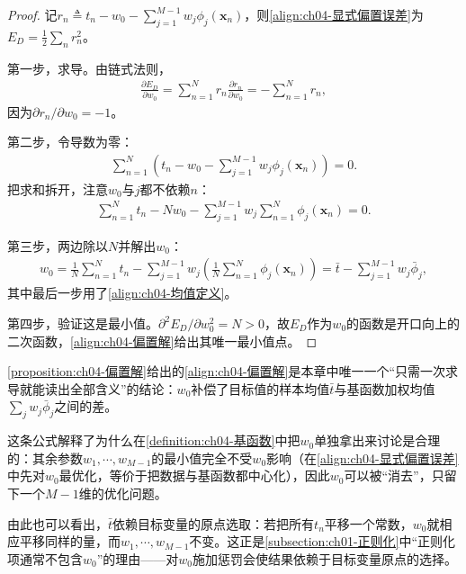 \documentclass[../../main.tex]{subfiles}
\begin{document}
\begin{proof}
记$r_n\triangleq t_n-w_0-\sum_{j=1}^{M-1}w_j\phi_j(\boldsymbol{x}_n)$，则\eqref{align:ch04-显式偏置误差}为$E_D=\frac{1}{2}\sum_n r_n^2$。

第一步，求导。由链式法则，
\begin{align*}
  \frac{\partial E_D}{\partial w_0}=\sum_{n=1}^{N}r_n\frac{\partial r_n}{\partial w_0}=-\sum_{n=1}^{N}r_n,
\end{align*}
因为$\partial r_n/\partial w_0=-1$。

第二步，令导数为零：
\begin{align*}
  \sum_{n=1}^{N}\left(t_n-w_0-\sum_{j=1}^{M-1}w_j\phi_j(\boldsymbol{x}_n)\right)=0.
\end{align*}
把求和拆开，注意$w_0$与$j$都不依赖$n$：
\begin{align*}
  \sum_{n=1}^{N}t_n-Nw_0-\sum_{j=1}^{M-1}w_j\sum_{n=1}^{N}\phi_j(\boldsymbol{x}_n)=0.
\end{align*}

第三步，两边除以$N$并解出$w_0$：
\begin{align*}
  w_0=\frac{1}{N}\sum_{n=1}^{N}t_n-\sum_{j=1}^{M-1}w_j\left(\frac{1}{N}\sum_{n=1}^{N}\phi_j(\boldsymbol{x}_n)\right)=\bar{t}-\sum_{j=1}^{M-1}w_j\bar{\phi}_j,
\end{align*}
其中最后一步用了\eqref{align:ch04-均值定义}。

第四步，验证这是最小值。$\partial^2E_D/\partial w_0^2=N>0$，故$E_D$作为$w_0$的函数是开口向上的二次函数，\eqref{align:ch04-偏置解}给出其唯一最小值点。
\end{proof}

\begin{remark}
\cref{proposition:ch04-偏置解}给出的\eqref{align:ch04-偏置解}是本章中唯一一个“只需一次求导就能读出全部含义”的结论：$w_0$补偿了目标值的样本均值$\bar{t}$与基函数加权均值$\sum_jw_j\bar{\phi}_j$之间的差。

这条公式解释了为什么在\cref{definition:ch04-基函数}中把$w_0$单独拿出来讨论是合理的：其余参数$w_1,\cdots,w_{M-1}$的最小值完全不受$w_0$影响（在\eqref{align:ch04-显式偏置误差}中先对$w_0$最优化，等价于把数据与基函数都中心化），因此$w_0$可以被“消去”，只留下一个$M-1$维的优化问题。

由此也可以看出，$\bar{t}$依赖目标变量的原点选取：若把所有$t_n$平移一个常数，$w_0$就相应平移同样的量，而$w_1,\cdots,w_{M-1}$不变。这正是\cref{subsection:ch01-正则化}中“正则化项通常不包含$w_0$”的理由——对$w_0$施加惩罚会使结果依赖于目标变量原点的选择。
\end{remark}
\end{document}
